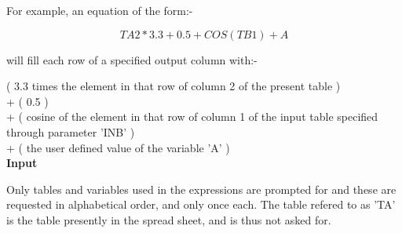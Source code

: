 {{\begin{enumerate}
   \end{enumerate}
  For example, an equation of the form:-

  $$        TA2*3.3+0.5+COS(TB1)+A $$

  will fill each row of a specified output column with:-

\hspace*{1.0em}    ( 3.3 times the element in that row of column 2 of the present
        table ) \hspace*{\fill} \\
  + ( 0.5 )  \hspace*{\fill} \\
  + ( cosine of the element in that row of column 1 of the input table 
        specified through parameter 'INB' )   \hspace*{\fill} \\
  + ( the user defined value of the variable 'A' ) \hspace*{\fill} \\

  {\bf \large Input}

  Only tables and variables used in the expressions are prompted for and
  these are requested in alphabetical order, and only once each.
  The table refered to as 'TA' is the table presently in the spread
  sheet, and is thus not asked for.

}}
